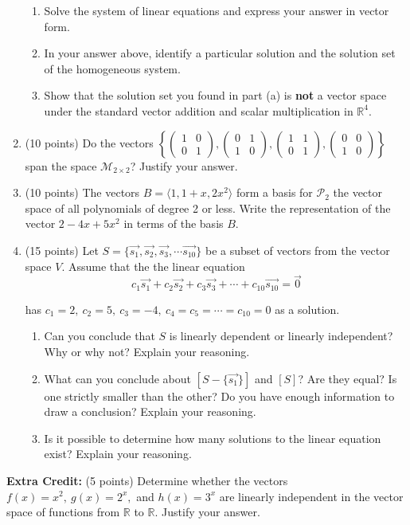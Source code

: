 \documentclass[12pt]{article}
\renewcommand{\emph}[1]{\textsf{\textbf{#1}}}
\newcommand{\bpm}{\begin{pmatrix}}
\newcommand{\epm}{\end{pmatrix}}
\begin{document}
\begin{enumerate}
	\begin{enumerate}
	\item Solve the system of linear equations and express your answer in vector form.
	\vfill
	\item In your answer above, identify a particular solution and the solution set of the homogeneous system.
	\vspace{1in}
	\item Show that the solution set you found in part (a) is \emph{not} a vector space under the standard vector addition and scalar multiplication in  $\mathbb{R}^4.$
	\vfill
	\end{enumerate}
\newpage
\item (10 points) Do the vectors $\displaystyle \left\{ \bpm 1&0\\0&1 \epm,  \bpm 0&1\\1&0 \epm, \bpm 1&1\\0&1 \epm, \bpm 0&0\\1&0 \epm\right\}$ span the space $\mathcal{M}_{2 \times 2}$? Justify your answer.
\vfill
\item (10 points) The vectors $\displaystyle B= \langle 1, 1+x, 2x^2 \rangle$ form a basis for $\mathcal{P}_2$ the vector space of all polynomials of degree 2 or less. Write the representation of the vector $2-4x+5x^2$ in terms of the basis $B.$
\vfill
\newpage
\item (15 points) Let $\displaystyle S=\{ \vec{s_1},  \vec{s_2},  \vec{s_3}, \cdots  \vec{s_{10}} \}$ be a subset of vectors from the vector space $V.$ Assume that the the linear equation 
$$c_1\vec{s_1} +c_2\vec{s_2} +c_3\vec{s_3} +\cdots+c_{10}\vec{s_{10}} =\vec{0}$$

has $c_1=2, \: c_2=5, \: c_3=-4, \: c_4=c_5= \cdots = c_{10}=0$ as a solution.\\
	\begin{enumerate}
	\item Can you conclude that $S$ is linearly dependent or linearly independent? Why or why not? Explain your reasoning.
	\vfill
	\item What can you conclude about $\displaystyle [S-\{ \vec{s_1} \}]$ and $\displaystyle [S]$? Are they equal? Is one strictly smaller than the other? Do you have enough information to draw a conclusion? Explain your reasoning.
	\vfill
	\item Is it possible to determine how many solutions to the linear equation exist? Explain your reasoning.
	\vfill
	\end{enumerate}
\end{enumerate}
\newpage
\textbf{Extra Credit:} (5 points) Determine whether the vectors $f(x)=x^2, \: g(x)=2^x,$ and $h(x)=3^x$ are linearly independent in the vector space of functions from $\mathbb{R}$ to $\mathbb{R}.$ Justify your answer.
\end{document}
